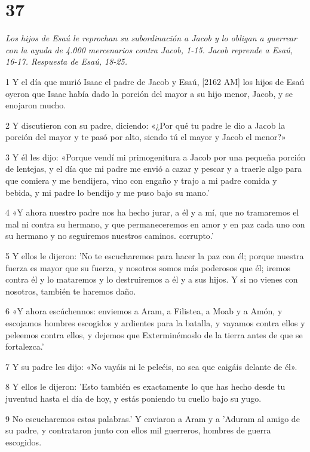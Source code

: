 \chapter{37}

\par \textit{Los hijos de Esaú le reprochan su subordinación a Jacob y lo obligan a guerrear con la ayuda de 4.000 mercenarios contra Jacob, 1-15. Jacob reprende a Esaú, 16-17. Respuesta de Esaú, 18-25.}

\par 1 Y el día que murió Isaac el padre de Jacob y Esaú, [2162 AM] los hijos de Esaú oyeron que Isaac había dado la porción del mayor a su hijo menor, Jacob, y se enojaron mucho.
\par 2 Y discutieron con su padre, diciendo: «¿Por qué tu padre le dio a Jacob la porción del mayor y te pasó por alto, siendo tú el mayor y Jacob el menor?»
\par 3 Y él les dijo: «Porque vendí mi primogenitura a Jacob por una pequeña porción de lentejas, y el día que mi padre me envió a cazar y pescar y a traerle algo para que comiera y me bendijera, vino con engaño y trajo a mi padre comida y bebida, y mi padre lo bendijo y me puso bajo su mano.'
\par 4 «Y ahora nuestro padre nos ha hecho jurar, a él y a mí, que no tramaremos el mal ni contra su hermano, y que permaneceremos en amor y en paz cada uno con su hermano y no seguiremos nuestros caminos. corrupto.'
\par 5 Y ellos le dijeron: 'No te escucharemos para hacer la paz con él; porque nuestra fuerza es mayor que su fuerza, y nosotros somos más poderosos que él; iremos contra él y lo mataremos y lo destruiremos a él y a sus hijos. Y si no vienes con nosotros, también te haremos daño.
\par 6 «Y ahora escúchennos: enviemos a Aram, a Filistea, a Moab y a Amón, y escojamos hombres escogidos y ardientes para la batalla, y vayamos contra ellos y peleemos contra ellos, y dejemos que Exterminémoslo de la tierra antes de que se fortalezca.'
\par 7 Y su padre les dijo: «No vayáis ni le peleéis, no sea que caigáis delante de él».
\par 8 Y ellos le dijeron: 'Esto también es exactamente lo que has hecho desde tu juventud hasta el día de hoy, y estás poniendo tu cuello bajo su yugo.
\par 9 No escucharemos estas palabras.' Y enviaron a Aram y a 'Aduram al amigo de su padre, y contrataron junto con ellos mil guerreros, hombres de guerra escogidos.
